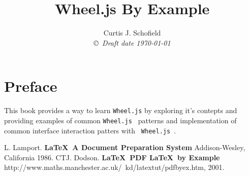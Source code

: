 \documentclass[14pt]{book}
\title{Wheel.js By Example  }
\author{Curtis J. Schofield \\
{\small\em \copyright \  Draft date \today }}
\begin{document}
\tableofcontents
\chapter*{Preface}\normalsize
\pagestyle{plain}
This book provides a way to learn {\tt Wheel.js} by exploring it's
contepts and providing examples of common {\tt Wheel.js } patterns
and implementation of common interface interaction patters with {\tt
Wheel.js }.




\pagestyle{headings}







\begin{thebibliography}{99}
 L. Lamport. {\bf \LaTeX \ A Document Preparation System}
Addison-Wesley, California 1986.
 CTJ. Dodson. {\bf \LaTeX \ PDF \LaTeX \ by Example}
http://www.maths.manchester.ac.uk/~kd/latextut/pdfbyex.htm, 2001.
\end{thebibliography}
\end{document}
